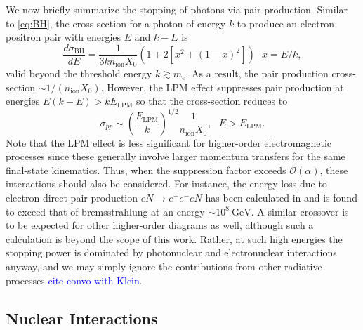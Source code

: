 \documentclass[twocolumn,showpacs,preprintnumbers,amsmath,amssymb,prd]{revtex4}
\newcommand{\OO}{\mathcal{O}}
\newcommand{\GeV}{\text{GeV}}
\def\r{\right)}
\def\l{\left(}
\begin{document}
\begin{appendices}
We now briefly summarize the stopping of photons via pair production. Similar to \eqref{eq:BH}, the cross-section for a photon of energy $k$ to produce an electron-positron pair with energies $E$ and $k-E$ is
\begin{equation}
\label{eq:PP}
\frac{d \sigma_\text{BH}}{dE} = \frac{1}{3 k n_\text{ion} X_0} (1+ 2[x^2+ (1-x)^2]) ~~~ x = E/k,
\end{equation}
valid beyond the threshold energy $k \gtrsim m_e$. 
As a result, the pair production cross-section $\sim 1/(n_\text{ion} X_0)$.
However, the LPM effect suppresses pair production at energies $E(k-E) > k E_\text{LPM}$ so that the cross-section reduces to
\begin{equation}
\sigma_{pp} \sim \l\frac{E_\text{LPM}}{k} \r^{1/2} \frac{1}{n_\text{ion} X_0}, ~~~ E>E_\text{LPM}.
\end{equation}
Note that the LPM effect is less significant for higher-order electromagnetic processes since these generally involve larger momentum transfers for the same final-state kinematics.
Thus, when the suppression factor exceeds $\OO(\alpha)$, these interactions should also be considered.
For instance, the energy loss due to electron direct pair production $eN \to e^+ e^- e N$ has been calculated in \cite{Gerhardt:2010bj} and is found to exceed that of bremsstrahlung at an energy $\sim 10^{8} ~\GeV$. 
A similar crossover is to be expected for other higher-order diagrams as well, although such a calculation is beyond the scope of this work. 
Rather, at such high energies the stopping power is dominated by photonuclear and electronuclear interactions anyway, and we may simply ignore the contributions from other radiative processes \textcolor{blue}{cite convo with Klein}. 

\subsection{Nuclear Interactions}


\end{appendices}
\end{document}
